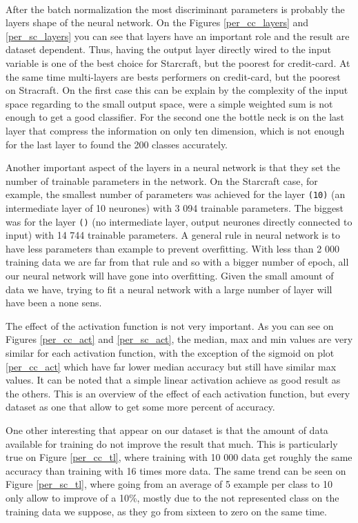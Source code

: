 \documentclass[twocolumn,a4paper,10pt]{article}
\begin{document}
\paragraph{}
After the batch normalization the most discriminant parameters is probably the layers shape of the neural network. On the Figures \ref{per_cc_layers} and \ref{per_sc_layers} you can see that layers have an important role and the result are dataset dependent. Thus, having the output layer directly wired to the input variable is one of the best choice for Starcraft, but the poorest for credit-card. At the same time multi-layers are bests performers on credit-card, but the poorest on Stracraft. On the first case this can be explain by the complexity of the input space regarding to the small output space, were a simple weighted sum is not enough to get a good classifier. For the second one the bottle neck is on the last layer that compress the information on only ten dimension, which is not enough for the last layer to found the 200 classes accurately.

Another important aspect of the layers in a neural network is that they set the number of trainable parameters in the network. On the Starcraft case, for example, the smallest number of parameters was achieved for the layer \texttt{(10)} (an intermediate layer of 10 neurones) with 3 094 trainable parameters. The biggest was for the layer \texttt{()} (no intermediate layer, output neurones directly connected to input) with 14 744 trainable parameters. A general rule in neural network is to have less parameters than example to prevent overfitting. With less than 2 000 training data we are far from that rule and so with a bigger number of epoch, all our neural network will have gone into overfitting. Given the small amount of data we have, trying to fit a neural network with a large number of layer will have been a none sens.

The effect of the activation function is not very important. As you can see on Figures \ref{per_cc_act} and \ref{per_sc_act}, the median, max and min values are very similar for each activation function, with the exception of the sigmoid on plot \ref{per_cc_act} which have far lower median accuracy but still have similar max values. It can be noted that a simple linear activation achieve as good result as the others. This is an overview of the effect of each activation function, but every dataset as one that allow to get some more percent of accuracy.

One other interesting that appear on our dataset is that the amount of data available for training do not improve the result that much. This is particularly true on Figure \ref{per_cc_tl}, where training with 10 000 data get roughly the same accuracy than training with 16 times more data. The same trend can be seen on Figure \ref{per_sc_tl}, where going from an average of 5 example per class to 10 only allow to improve of a 10\%, mostly due to the not represented class on the training data we suppose, as they go from sixteen to zero on the same time.
\end{document}
